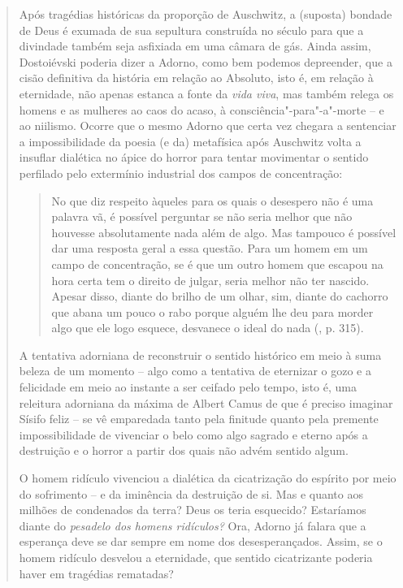 {\begin{quote}
Após tragédias históricas da proporção de Auschwitz, a (suposta) bondade
de Deus é exumada de sua sepultura construída no século  para que a
divindade também seja asfixiada em uma câmara de gás. Ainda assim,
Dostoiévski poderia dizer a Adorno, como bem podemos depreender, que a
cisão definitiva da história em relação ao Absoluto, isto é, em relação
à eternidade, não apenas estanca a fonte da \emph{vida viva}, mas também
relega os homens e as mulheres ao caos do acaso, à
consciência"-para"-a"-morte -- e ao niilismo. Ocorre que o mesmo Adorno que
certa vez chegara a sentenciar a impossibilidade da poesia (e da)
metafísica após Auschwitz volta a insuflar dialética no ápice do horror
para tentar movimentar o sentido perfilado pelo extermínio industrial
dos campos de concentração:

\begin{quote}
No que diz respeito àqueles para os quais o desespero não é uma palavra
vã, é possível perguntar se não seria melhor que não houvesse
absolutamente nada além de algo. Mas tampouco é possível dar uma
resposta geral a essa questão. Para um homem em um campo de
concentração, se é que um outro homem que escapou na hora certa tem o
direito de julgar, seria melhor não ter nascido. Apesar disso, diante do
brilho de um olhar, sim, diante do cachorro que abana um pouco o rabo
porque alguém lhe deu para morder algo que ele logo esquece, desvanece o
ideal do nada (, p. 315).
\end{quote}

A tentativa adorniana de reconstruir o sentido histórico em meio à suma
beleza de um momento -- algo como a tentativa de eternizar o gozo e a
felicidade em meio ao instante a ser ceifado pelo tempo, isto é, uma
releitura adorniana da máxima de Albert Camus de que é preciso imaginar
Sísifo feliz -- se vê emparedada tanto pela finitude quanto pela
premente impossibilidade de vivenciar o belo como algo sagrado e eterno
após a destruição e o horror a partir dos quais não advém sentido algum.

O homem ridículo vivenciou a dialética da cicatrização do espírito por
meio do sofrimento -- e da iminência da destruição de si. Mas e quanto
aos milhões de condenados da terra? Deus os teria esquecido? Estaríamos
diante do \emph{pesadelo dos homens ridículos?} Ora, Adorno já falara
que a esperança deve se dar sempre em nome dos desesperançados. Assim,
se o homem ridículo desvelou a eternidade, que sentido cicatrizante
poderia haver em tragédias rematadas?


\end{quote}}
